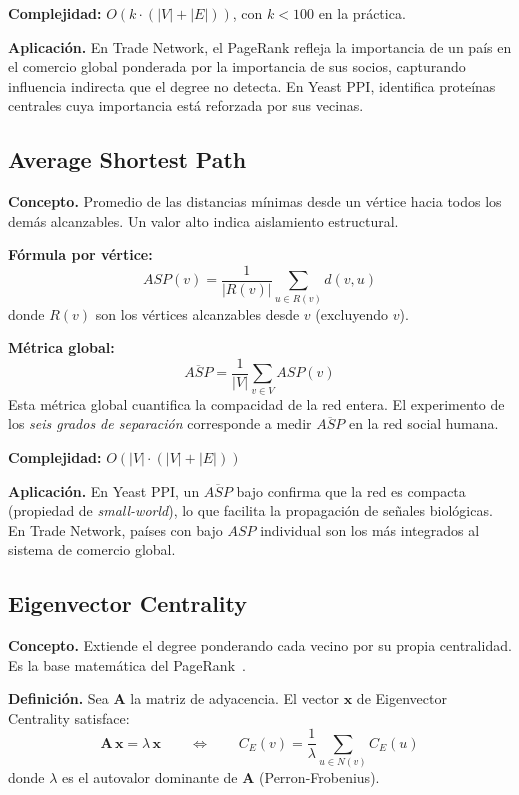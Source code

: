 \textbf{Complejidad:} $O(k \cdot (|V|+|E|))$, con $k < 100$ en la práctica.

\textbf{Aplicación.} En Trade Network, el PageRank refleja la importancia de un
país en el comercio global ponderada por la importancia de sus socios, capturando
influencia indirecta que el degree no detecta. En Yeast PPI, identifica proteínas
centrales cuya importancia está reforzada por sus vecinas.

\subsection{Average Shortest Path}

\textbf{Concepto.} Promedio de las distancias mínimas desde un vértice hacia todos
los demás alcanzables. Un valor alto indica aislamiento estructural.

\textbf{Fórmula por vértice:}
\[
ASP(v) = \frac{1}{|R(v)|} \sum_{u \in R(v)} d(v, u)
\]
donde $R(v)$ son los vértices alcanzables desde $v$ (excluyendo $v$).

\textbf{Métrica global:}
\[
\overline{ASP} = \frac{1}{|V|} \sum_{v \in V} ASP(v)
\]
Esta métrica global cuantifica la compacidad de la red entera. El experimento de
los \textit{seis grados de separación} corresponde a medir $\overline{ASP}$ en la
red social humana.

\textbf{Complejidad:} $O(|V| \cdot (|V|+|E|))$

\textbf{Aplicación.} En Yeast PPI, un $\overline{ASP}$ bajo confirma que la red
es compacta (propiedad de \textit{small-world}), lo que facilita la propagación
de señales biológicas. En Trade Network, países con bajo $ASP$ individual son los
más integrados al sistema de comercio global.

\subsection{Eigenvector Centrality}

\textbf{Concepto.} Extiende el degree ponderando cada vecino por su propia
centralidad. Es la base matemática del PageRank~\cite{bonacich1987}.

\textbf{Definición.} Sea $\mathbf{A}$ la matriz de adyacencia. El vector
$\mathbf{x}$ de Eigenvector Centrality satisface:
\[
\mathbf{A}\,\mathbf{x} = \lambda\,\mathbf{x}
\qquad \Longleftrightarrow \qquad
C_E(v) = \frac{1}{\lambda} \sum_{u \in N(v)} C_E(u)
\]
donde $\lambda$ es el autovalor dominante de $\mathbf{A}$ (Perron-Frobenius).

